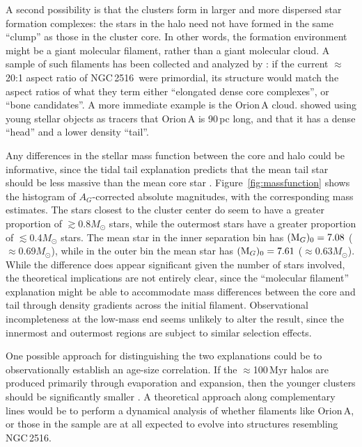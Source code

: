 \documentclass[12pt,twocolumn,tighten]{aastex63}
\newcommand{\cn}{NGC\,2516} %
\begin{document}
A second possibility is that the clusters form in larger and more
dispersed star formation complexes: the stars in the halo need not
have formed in the same ``clump'' as those in the cluster core.  In
other words, the formation environment might be a
giant molecular filament, rather than a giant molecular cloud.  A
sample of such filaments has been collected and analyzed by
\citet{zucker_physical_2018}: if the current $\approx$20:1 aspect
ratio of \cn\ were primordial, its structure would match the aspect
ratios of what they term either ``elongated dense core complexes'', or
``bone candidates''.  A more immediate example is the Orion\,A cloud.
\citet{grosschedl_3d_2018} showed using young stellar objects as
tracers that Orion\,A is 90\,pc long, and that it has a dense ``head''
and a lower density ``tail''.

Any differences in the stellar mass function between the core and halo
could be informative, since the tidal tail explanation predicts that
the mean tail star should be less massive than the mean core
star \citep[{\it e.g.},][]{chumak_tails_2006}.
Figure~\ref{fig:massfunction} shows the histogram of $A_G$-corrected
absolute magnitudes, with the corresponding
\citet{pecaut_mamajek_2013} mass estimates.  The stars closest to the
cluster center do seem to have a greater proportion of $\gtrsim$0.8$M_\odot$
stars, while the outermost stars have a greater proportion of
$\lesssim$0.4$M_\odot$ stars.  The mean star in the inner separation
bin has $({\rm M}_G)_0=7.08$ ($\approx$0.69$M_\odot$), while in the
outer bin the mean star has $({\rm M}_G)_0=7.61$
($\approx$0.63$M_\odot$).  While the difference does appear
significant given the number of stars involved, the theoretical
implications are not entirely clear, since the ``molecular filament''
explanation might be able to accommodate mass differences between the
core and tail through density gradients across the initial filament.
Observational incompleteness at the low-mass end seems unlikely to
alter the result, since the innermost and outermost regions are 
subject to similar selection effects.

One possible approach for distinguishing the two explanations could be
to observationally establish an age-size correlation.  If the
$\approx$100\,Myr halos are produced primarily through evaporation and
expansion, then the younger clusters should be significantly smaller
\citep{chumak_tails_2006,chumak_realOCs_2006}.  A theoretical approach
along complementary lines would be to perform a dynamical analysis of
whether filaments like Orion\,A, or those in the
\citet{zucker_physical_2018} sample are at all expected to evolve into
structures resembling \cn.
\end{document}
